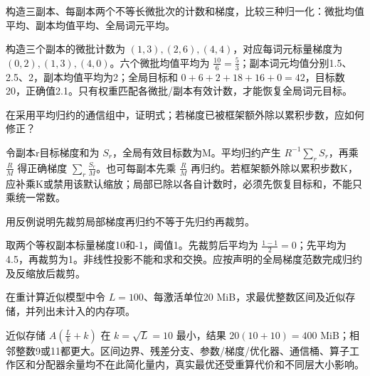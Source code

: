 
\begin{exercises}
\begin{exercise} 构造三副本、每副本两个不等长微批次的计数和梯度，比较三种归一化：微批均值平均、副本均值平均、全局词元平均。

\begin{solution}
构造三个副本的微批计数为 $(1,3),(2,6),(4,4)$，对应每词元标量梯度为 $(0,2),(1,3),(4,0)$。六个微批均值平均为 $\frac{10}{6}=\frac{5}{3}$；副本词元均值分别1.5、2.5、2，副本均值平均为2；全局目标和 $0+6+2+18+16+0=42$，目标数20，正确值2.1。只有权重匹配各微批/副本有效计数，才能恢复全局词元目标。
\end{solution}
\end{exercise}

\begin{exercise} 在采用平均归约的通信组中，证明式；若梯度已被框架额外除以累积步数，应如何修正？

\begin{solution}
令副本r目标梯度和为 $S_r$，全局有效目标数为M。平均归约产生 $R^{-1}\sum_rS_r$，再乘 $\frac{R}{M}$ 得正确梯度 $\sum_r\frac{S_r}{M}$。也可每副本先乘 $\frac{R}{M}$ 再归约。若框架额外除以累积步数K，应补乘K或禁用该默认缩放；局部已除以各自计数时，必须先恢复目标和，不能只乘统一常数。
\end{solution}
\end{exercise}

\begin{exercise} 用反例说明先裁剪局部梯度再归约不等于先归约再裁剪。

\begin{solution}
取两个等权副本标量梯度10和-1，阈值1。先裁剪后平均为 $\frac{1-1}{2}=0$；先平均为4.5，再裁剪为1。非线性投影不能和求和交换。应按声明的全局梯度范数完成归约及反缩放后裁剪。
\end{solution}
\end{exercise}

\begin{exercise} 在重计算近似模型中令 $L=100$、每激活单位20 MiB，求最优整数区间及近似存储，并列出未计入的内存项。

\begin{solution}
近似存储 $A(\frac{L}{k}+k)$ 在 $k=\sqrt L=10$ 最小，结果 $20(10+10)=400$ MiB；相邻整数9或11都更大。区间边界、残差分支、参数/梯度/优化器、通信桶、算子工作区和分配器余量均不在此简化量内，真实最优还受重算代价和不同层大小影响。
\end{solution}
\end{exercise}


\end{exercises}
